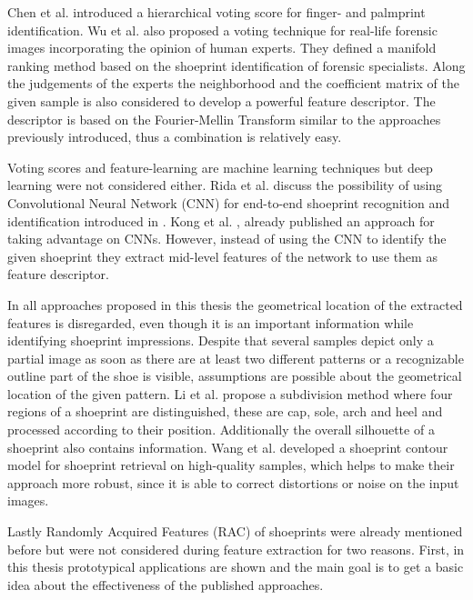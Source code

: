 \documentclass[draft,final]{vutinfth} %
\begin{document}
Chen et al. \cite{chen2013hierarchical} introduced a hierarchical voting score for finger- and palmprint identification.
Wu et al. \cite{wu2019losgsr} also proposed a voting technique for real-life forensic images incorporating the opinion of human experts.
They defined a manifold ranking method based on the shoeprint identification of forensic specialists.
Along the judgements of the experts the neighborhood and the coefficient matrix of the given sample is also considered to develop a powerful feature descriptor.
The descriptor is based on the Fourier-Mellin Transform similar to the approaches previously introduced, thus a combination is relatively easy.
\par
Voting scores and feature-learning are machine learning techniques but deep learning \cite{lecun2015deep} were not considered either.
Rida et al. \cite{rida2019forensic} discuss the possibility of using Convolutional Neural Network (CNN) for end-to-end shoeprint recognition and identification introduced in \cite{lecun1998gradient}.
Kong et al. \cite{kong2017cross}, \cite{kong2019cross} already published an approach for taking advantage on CNNs.
However, instead of using the CNN to identify the given shoeprint they extract mid-level features of the network to use them as feature descriptor.
\par
In all approaches proposed in this thesis the geometrical location of the extracted features is disregarded, even though it is an important information while identifying shoeprint impressions.
Despite that several samples depict only a partial image as soon as there are at least two different patterns or a recognizable outline part of the shoe is visible, assumptions are possible about the geometrical location of the given pattern.
Li et al. \cite{li2015secondary} propose a subdivision method where four regions of a shoeprint are distinguished, these are cap, sole, arch and heel and processed according to their position.
Additionally the overall silhouette of a shoeprint also contains information.
Wang et al. \cite{wang2014automatic} developed a shoeprint contour model for shoeprint retrieval on high-quality samples, which helps to make their approach more robust, since it is able to correct distortions or noise on the input images.
\par
Lastly Randomly Acquired Features (RAC) of shoeprints were already mentioned before but were not considered during feature extraction for two reasons.
First, in this thesis prototypical applications are shown and the main goal is to get a basic idea about the effectiveness of the published approaches.
\end{document}
